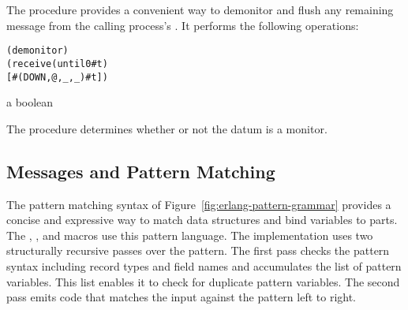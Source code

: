 The  procedure provides a convenient way to
demonitor and flush any remaining  message from the
calling process's . It performs the following operations:
\antipar\begin{alltt}
(demonitor )
(receive (until 0 #t)
  [#(DOWN ,@ ,_ ,_) #t])
\end{alltt}

\begin{procedure}
\end{procedure}
\returns{} a boolean

The  procedure determines whether or not the datum
 is a monitor.

\subsection {Messages and Pattern Matching}

The pattern matching syntax of Figure~\ref{fig:erlang-pattern-grammar}
provides a concise and expressive way to match data structures and
bind variables to parts. The , , and
 macros use this pattern language. The
implementation uses two structurally recursive passes over the
pattern. The first pass checks the pattern syntax including record
types and field names and accumulates the list of pattern
variables. This list enables it to check for duplicate pattern
variables.  The second pass emits code that matches the input against
the pattern left to right.

